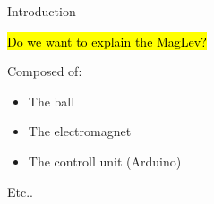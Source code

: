 \begin{frame}{Introduction}

    \hl{Do we want to explain the MagLev?}

    Composed of:

    \begin{itemize}
        \item The ball
        \item The electromagnet
        \item The controll unit (Arduino)
    \end{itemize}

    Etc..

\end{frame}